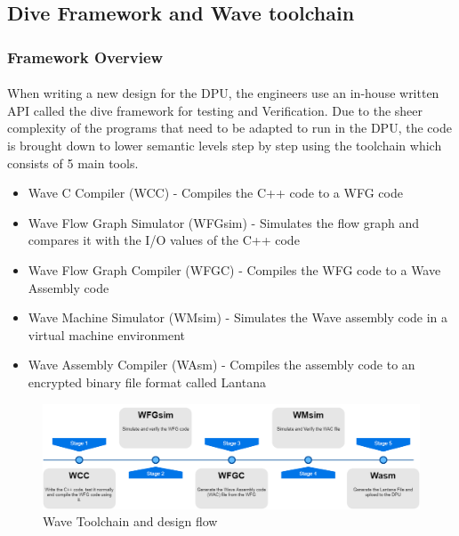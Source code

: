 
\newpage
\subsection{Dive Framework and Wave toolchain}

\subsubsection{Framework Overview}

\paragraph{}
When writing a new design for the DPU, the engineers use an in-house written API called the dive framework for testing and Verification. Due to the sheer complexity of the programs that need to be adapted to run in the DPU, the code is brought down to lower semantic levels step by step using the toolchain which consists of 5 main tools.

\begin{itemize}
    \item Wave C Compiler (WCC) - Compiles the C++ code to a WFG code 
    \item Wave Flow Graph Simulator (WFGsim) - Simulates the flow graph and compares it with the I/O values of the C++ code
    \item Wave Flow Graph Compiler (WFGC) - Compiles the WFG code to a Wave Assembly code
    \item Wave Machine Simulator (WMsim) - Simulates the Wave assembly code in a virtual machine environment
    \item Wave Assembly Compiler (WAsm) - Compiles the assembly code to an encrypted binary file format called Lantana
\end{itemize}


\begin{figure}[h]
    \centering
    \includegraphics[trim=0cm 0cm 0cm 0cm, clip=true,scale=0.35]{figures/wave_flow.png}
    \caption{Wave Toolchain and design flow\label{Fig:waveflow}}\vspace{-4mm}
    \end{figure}

